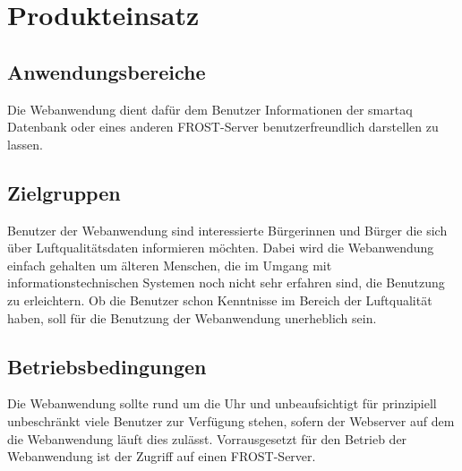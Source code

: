 \section{Produkteinsatz}

\subsection{Anwendungsbereiche}

Die \gls{Webanwendung} dient dafür dem Benutzer Informationen der \gls{smartaq} Datenbank oder eines anderen \gls{FROST-Server} benutzerfreundlich darstellen zu lassen.

\subsection{Zielgruppen}

Benutzer der \gls{Webanwendung} sind interessierte Bürgerinnen und Bürger die sich über Luftqualitätsdaten informieren möchten. 
Dabei wird die \gls{Webanwendung} einfach gehalten um älteren Menschen, die im Umgang mit informationstechnischen Systemen noch nicht sehr erfahren sind, die Benutzung zu erleichtern.
Ob die Benutzer schon Kenntnisse im Bereich der Luftqualität haben, soll für die Benutzung der \gls{Webanwendung} unerheblich sein.

\subsection{Betriebsbedingungen}

Die \gls{Webanwendung} sollte rund um die Uhr und unbeaufsichtigt für prinzipiell unbeschränkt viele Benutzer zur Verfügung stehen, sofern der \gls{Webserver} auf dem die \gls{Webanwendung} läuft dies zulässt. 
Vorrausgesetzt für den Betrieb der \gls{Webanwendung} ist der Zugriff auf einen \gls{FROST-Server}.
